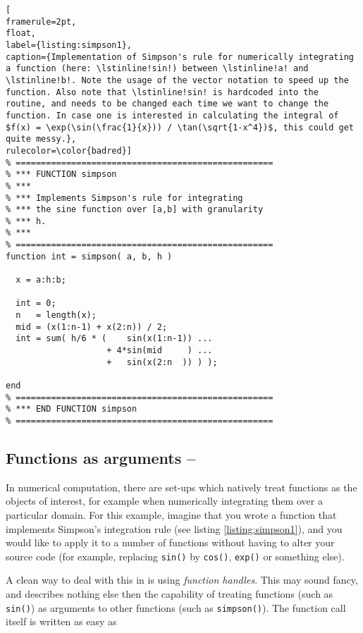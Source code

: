 \begin{lstlisting}[
framerule=2pt,
float,
label={listing:simpson1},
caption={Implementation of Simpson's rule for numerically integrating a function (here: \lstinline!sin!) between \lstinline!a! and \lstinline!b!. Note the usage of the vector notation to speed up the function. Also note that \lstinline!sin! is hardcoded into the routine, and needs to be changed each time we want to change the function. In case one is interested in calculating the integral of $f(x) = \exp(\sin(\frac{1}{x})) / \tan(\sqrt{1-x^4})$, this could get quite messy.},
rulecolor=\color{badred}]
% ===================================================
% *** FUNCTION simpson
% ***
% *** Implements Simpson's rule for integrating
% *** the sine function over [a,b] with granularity
% *** h.
% ***
% ===================================================
function int = simpson( a, b, h )

  x = a:h:b;

  int = 0;
  n   = length(x);
  mid = (x(1:n-1) + x(2:n)) / 2;
  int = sum( h/6 * (    sin(x(1:n-1)) ...
                    + 4*sin(mid     ) ...
                    +   sin(x(2:n  )) ) );

end
% ===================================================
% *** END FUNCTION simpson
% ===================================================
\end{lstlisting}

\subsection{Functions as arguments -- \cleansymbol\cleansymbol\cleansymbol}

In numerical computation, there are set-ups which natively treat functions as the objects of interest, for example when numerically integrating them over a particular domain. For this example, imagine that you wrote a function that implements Simpson's integration rule (see listing \ref{listing:simpson1}), and you would like to apply it to a number of functions without having to alter your source code (for example, replacing \lstinline!sin()! by \lstinline!cos()!, \lstinline!exp()! or something else).

A clean way to deal with this in \matlab{} is using \emph{function handles}. This may sound fancy, and describes nothing else then the capability of treating functions (such as \lstinline!sin()!) as arguments to other functions (such as \lstinline!simpson()!). The function call itself is written as easy as

